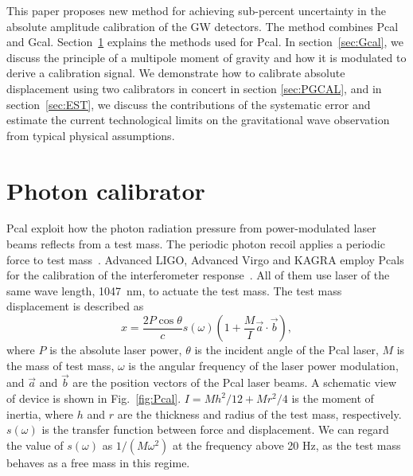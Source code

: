 \documentclass[%
 reprint,
superscriptaddress,
 amsmath,amssymb,
 aps,
]{revtex4-1}
\begin{document}
This paper proposes new method for achieving sub-percent uncertainty in the absolute amplitude calibration of the GW detectors. The method combines Pcal and Gcal.
Section~\ref{sec:Pcal} explains the methods used for Pcal. In section~\ref{sec:Gcal}, we discuss the principle of a multipole moment of gravity and how it is modulated to derive a calibration signal.
We demonstrate how to calibrate absolute displacement using two calibrators in concert in section \ref{sec:PGCAL}, and in section~\ref{sec:EST}, we discuss the contributions of the systematic error and estimate the current technological limits on the gravitational wave observation from typical physical assumptions. 

\section{Photon calibrator} \label{sec:Pcal}
Pcal exploit how the photon radiation pressure from power-modulated laser beams reflects from a test mass. The periodic photon recoil applies a periodic force to test mass~\cite{doi:10.1063/1.4967303}. 
Advanced LIGO, Advanced Virgo and KAGRA employ Pcals for the calibration of the interferometer response~\cite{0264-9381-34-1-015002, KAGRA_Pcal,0264-9381-32-2-024001}. All of them use laser of the same wave length, 1047~nm, to actuate the test mass. The test mass displacement is described as
\begin{equation}
 x = \frac{2P \cos{\theta}}{c} s(\omega)\left(1+\frac{M}{I}\vec{a} \cdot \vec{b} \right) , \label{eq:pcal}
\end{equation}
where $P$ is the absolute laser power, $\theta$ is the incident angle of the Pcal laser, $M$ is the mass of test mass, $\omega$ is the angular frequency of the laser power modulation, and $\vec{a}$ and $\vec{b}$ are the position vectors of the Pcal laser beams. A schematic view of device is shown in Fig.~\ref{fig:Pcal}. $I=Mh^2/12+Mr^2/4$ is the moment of inertia, where $h$ and  $r$ are the thickness and radius of the test mass, respectively. $s(\omega)$ is the transfer function between force and displacement. We can regard the value of $s(\omega)$ as $1/(M \omega^2)$ at the frequency above 20 Hz, as the test mass behaves as a free mass in this regime. 
\end{document}
